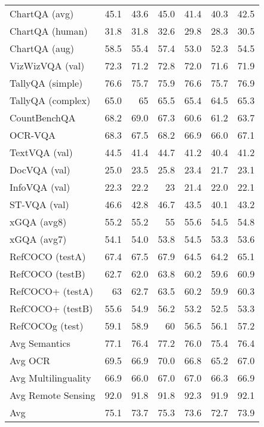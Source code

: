 {\begin{longtable}{l|rrr|rrr}
ChartQA (avg) & 45.1 & 43.6 & 45.0 & 41.4 & 40.3 & 42.5 \\
ChartQA (human) & 31.8 & 31.8 & 32.6 & 29.8 & 28.3 & 30.5 \\
ChartQA (aug) & 58.5 & 55.4 & 57.4 & 53.0 & 52.3 & 54.5 \\
VizWizVQA (val) & 72.3 & 71.2 & 72.8 & 72.0 & 71.6 & 71.9 \\
TallyQA (simple) & 76.6 & 75.7 & 75.9 & 76.6 & 75.7 & 76.9 \\
TallyQA (complex) & 65.0 & 65 & 65.5 & 65.4 & 64.5 & 65.3 \\
CountBenchQA & 68.2 & 69.0 & 67.3 & 60.6 & 61.2 & 63.7 \\
OCR-VQA & 68.3 & 67.5 & 68.2 & 66.9 & 66.0 & 67.1 \\
TextVQA (val) & 44.5 & 41.4 & 44.7 & 41.2 & 40.4 & 41.2 \\
DocVQA (val) & 25.0 & 23.5 & 25.8 & 23.4 & 21.7 & 23.1 \\
InfoVQA (val) & 22.3 & 22.2 & 23 & 21.4 & 22.0 & 22.1 \\
ST-VQA (val) & 46.6 & 42.8 & 46.7 & 43.5 & 40.1 & 43.2 \\
xGQA (avg8) & 55.2 & 55.2 & 55 & 55.6 & 54.5 & 54.8 \\
xGQA (avg7) & 54.1 & 54.0 & 53.8 & 54.5 & 53.3 & 53.6 \\
RefCOCO (testA) & 67.4 & 67.5 & 67.9 & 64.5 & 64.2 & 65.1 \\
RefCOCO (testB) & 62.7 & 62.0 & 63.8 & 60.2 & 59.6 & 60.9 \\
RefCOCO+ (testA) & 63 & 62.7 & 63.5 & 60.2 & 59.9 & 60.3 \\
RefCOCO+ (testB) & 55.6 & 54.9 & 56.2 & 53.2 & 52.5 & 53.3 \\
RefCOCOg (test) & 59.1 & 58.9 & 60 & 56.5 & 56.1 & 57.2 \\
Avg Semantics & 77.1 & 76.4 & 77.2 & 76.0 & 75.4 & 76.4 \\
Avg OCR & 69.5 & 66.9 & 70.0 & 66.8 & 65.2 & 67.0 \\
Avg Multilinguality & 66.9 & 66.0 & 67.0 & 67.0 & 66.3 & 66.9 \\
Avg Remote Sensing & 92.0 & 91.8 & 91.8 & 92.3 & 91.9 & 92.1 \\
Avg & 75.1 & 73.7 & 75.3 & 73.6 & 72.7 & 73.9 \\

\end{longtable}
}
